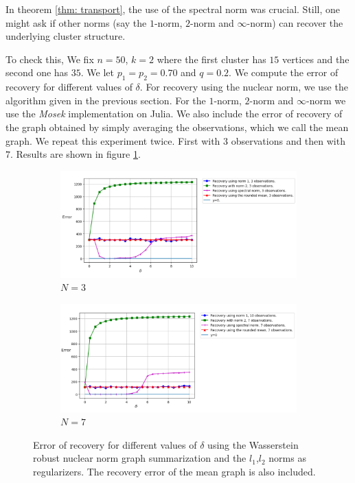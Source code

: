 \documentclass[12pt]{amsart}
\theoremstyle{remark}
\begin{document}
In theorem \ref{thm: transport}, the use of the spectral norm was crucial. Still, one might ask if other norms (say the $1$-norm, $2$-norm and $\infty$-norm) can recover the underlying cluster structure.

To check this, We fix $n=50$, $k=2$ where the first cluster has $15$ vertices and the second one has $35$. We let $p_1 = p_2 = 0.70$ and $q=0.2$. We compute the error of recovery for different values of $\delta$. For recovery using the nuclear norm, we use the algorithm given in the previous section. For the $1$-norm, $2$-norm and $\infty$-norm we use the \textit{Mosek} implementation on Julia. 
We also include the error of recovery of the graph obtained by simply averaging the observations, which we call the mean graph.
We repeat this experiment twice. First with $3$ observations and then with $7$.
Results are shown in figure \ref{fig:differentNorms}.


\begin{figure}
     \centering
     \begin{subfigure}[b]{1\textwidth}
         \centering
         \includegraphics[width=\textwidth]{./Pictures/differentNorms.PNG}
\caption{$N=3$}
     \end{subfigure}
     \hfill
     \begin{subfigure}[b]{1\textwidth}
         \centering
         \includegraphics[width=\textwidth]{./Pictures/differentNorms7.PNG}
         \caption{$N=7$}
     \end{subfigure}
\caption{Error of recovery for different values of $\delta$ using the Wasserstein robust nuclear norm graph summarization and the $l_1$,$l_2$ norms as regularizers. The recovery error of the mean graph is also included.}
        \label{fig:differentNorms}
\end{figure}
\end{document}

